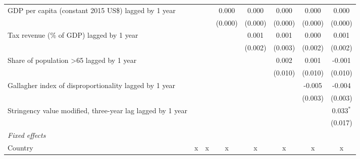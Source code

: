 \begin{tabular}{lccccccc}
   GDP per capita (constant 2015 US\$) lagged by 1 year                                 &               &               & 0.000         & 0.000         & 0.000         & 0.000         & 0.000\\   
                                                                                        &               &               & (0.000)       & (0.000)       & (0.000)       & (0.000)       & (0.000)\\   
   Tax revenue (\% of GDP) lagged by 1 year                                             &               &               &               & 0.001         & 0.001         & 0.000         & 0.001\\   
                                                                                        &               &               &               & (0.002)       & (0.003)       & (0.002)       & (0.002)\\   
   Share of population >65 lagged by 1 year                                             &               &               &               &               & 0.002         & 0.001         & -0.001\\   
                                                                                        &               &               &               &               & (0.010)       & (0.010)       & (0.010)\\   
   Gallagher index of disproportionality lagged by 1 year                               &               &               &               &               &               & -0.005        & -0.004\\   
                                                                                        &               &               &               &               &               & (0.003)       & (0.003)\\   
   Stringency value modified, three-year lag lagged by 1 year                           &               &               &               &               &               &               & 0.033$^{*}$\\   
                                                                                        &               &               &               &               &               &               & (0.017)\\   
   \emph{Fixed effects}\\
   Country                                                                              & x             & x             & x             & x             & x             & x             & x\\  

\end{tabular}
